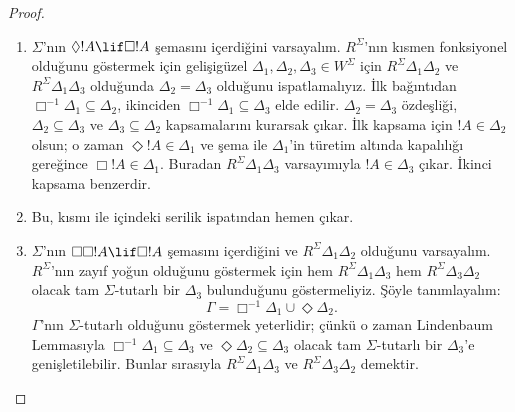 \begin{proof}
  \begin{enumerate}
  \item $\Sigma$'nın $\Diamond!A\lif\Box!A$ şemasını içerdiğini
    varsayalım. $R^\Sigma$'nın kısmen fonksiyonel olduğunu göstermek için
    gelişigüzel $\Delta_1,\Delta_2,\Delta_3\in W^\Sigma$ için
    $R^\Sigma\Delta_1\Delta_2$ ve $R^\Sigma\Delta_1\Delta_3$ olduğunda
    $\Delta_2=\Delta_3$ olduğunu ispatlamalıyız. İlk bağıntıdan
    $\Box^{-1}\Delta_1\subseteq\Delta_2$, ikinciden
    $\Box^{-1}\Delta_1\subseteq\Delta_3$
     elde edilir. $\Delta_2=\Delta_3$ özdeşliği,
    $\Delta_2\subseteq\Delta_3$ ve $\Delta_3\subseteq\Delta_2$
    kapsamalarını kurarsak çıkar. İlk kapsama için $!A\in\Delta_2$ olsun;
    o zaman $\Diamond!A\in\Delta_1$ ve şema ile $\Delta_1$'in türetim
    altında kapalılığı gereğince $\Box!A\in\Delta_1$. Buradan
    $R^\Sigma\Delta_1\Delta_3$ varsayımıyla $!A\in\Delta_3$ çıkar.
    İkinci kapsama benzerdir.

  \item Bu,  kısmı ile
     içindeki serilik ispatından hemen çıkar.

  \item $\Sigma$'nın $\Box\Box!A\lif\Box!A$ şemasını içerdiğini ve
    $R^\Sigma\Delta_1\Delta_2$ olduğunu varsayalım. $R^\Sigma$'nın zayıf
    yoğun olduğunu göstermek için hem $R^\Sigma\Delta_1\Delta_3$ hem
    $R^\Sigma\Delta_3\Delta_2$ olacak tam $\Sigma$-tutarlı bir $\Delta_3$
    bulunduğunu göstermeliyiz. Şöyle tanımlayalım:
    \[
    \Gamma=\Box^{-1}\Delta_1\cup\Diamond\Delta_2.
    \]
    $\Gamma$'nın $\Sigma$-tutarlı olduğunu göstermek yeterlidir; çünkü o
    zaman Lindenbaum Lemmasıyla $\Box^{-1}\Delta_1\subseteq\Delta_3$ ve
    $\Diamond\Delta_2\subseteq\Delta_3$ olacak tam $\Sigma$-tutarlı bir
    $\Delta_3$'e genişletilebilir. Bunlar sırasıyla
    $R^\Sigma\Delta_1\Delta_3$
     ve
    $R^\Sigma\Delta_3\Delta_2$
     demektir.


\end{enumerate}
\end{proof}
